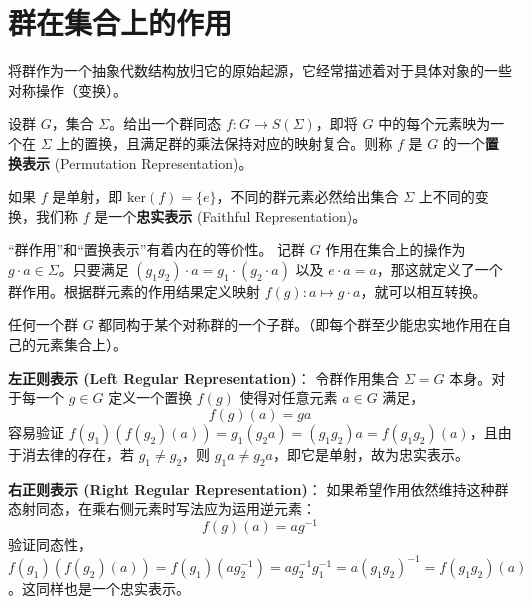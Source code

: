 \documentclass[11pt]{article}
\begin{document}
\section{群在集合上的作用}

将群作为一个抽象代数结构放归它的原始起源，它经常描述着对于具体对象的一些对称操作（变换）。

\begin{cndefinition}[群在集合上的作用的置换表示]
    设群 $G$，集合 $\Sigma$。给出一个群同态 $f: G \to S(\Sigma)$，即将 $G$ 中的每个元素映为一个在 $\Sigma$ 上的置换，且满足群的乘法保持对应的映射复合。则称 $f$ 是 $G$ 的一个\textbf{置换表示} (Permutation Representation)。
    
    如果 $f$ 是单射，即 $\text{ker}(f) = \{e\}$，不同的群元素必然给出集合 $\Sigma$ 上不同的变换，我们称 $f$ 是一个\textbf{忠实表示} (Faithful Representation)。
\end{cndefinition}

“群作用”和“置换表示”有着内在的等价性。
记群 $G$ 作用在集合上的操作为 $g \cdot a \in \Sigma$。只要满足 $(g_1 g_2)\cdot a = g_1 \cdot(g_2 \cdot a)$ 以及 $e \cdot a = a$，那这就定义了一个群作用。根据群元素的作用结果定义映射 $f(g): a \mapsto g \cdot a$，就可以相互转换。

\begin{cntheorem}
    任何一个群 $G$ 都同构于某个对称群的一个子群。（即每个群至少能忠实地作用在自己的元素集合上）。
\end{cntheorem}
\textbf{左正则表示 (Left Regular Representation)}：
    令群作用集合 $\Sigma = G$ 本身。对于每一个 $g \in G$ 定义一个置换 $f(g)$ 使得对任意元素 $a \in G$ 满足，
    \[
        f(g)(a) = ga
    \]
    容易验证 $f(g_1)(f(g_2)(a)) = g_1(g_2 a) = (g_1g_2)a = f(g_1 g_2)(a)$，且由于消去律的存在，若 $g_1 \neq g_2$，则 $g_1 a \neq g_2 a$，即它是单射，故为忠实表示。

\textbf{右正则表示 (Right Regular Representation)}：
    如果希望作用依然维持这种群态射同态，在乘右侧元素时写法应为运用逆元素：
    \[
        f(g)(a) = a g^{-1}
    \]
    验证同态性，$f(g_1)(f(g_2)(a)) = f(g_1)(a g_2^{-1}) = a g_2^{-1} g_1^{-1} = a (g_1 g_2)^{-1} = f(g_1 g_2)(a)$。这同样也是一个忠实表示。
\end{document}
